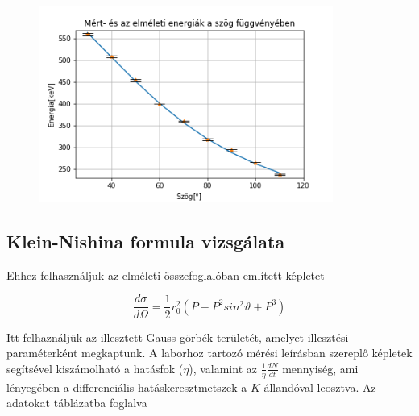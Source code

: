 \documentclass[a4paper,12pt]{article}
\begin{document}
\begin{figure}[!htb]
\centering
\includegraphics[width=0.86\textwidth]{en_deg.png}
\end{figure}

\subsection{Klein-Nishina formula vizsgálata}
\par Ehhez felhasználjuk az elméleti összefoglalóban említett képletet

\begin{equation*}
	\frac{d\sigma}{d\Omega} = \frac{1}{2}r_{0}^{2}(P - P^{2}sin^{2}\vartheta + P^{3})
\end{equation*}

\par Itt felhaználjük az illesztett Gauss-görbék területét, amelyet illesztési paraméterként megkaptunk. A laborhoz tartozó mérési leírásban szereplő képletek segítsével kiszámolható a hatásfok ($\eta$), valamint az $\frac{1}{\eta}\frac{dN}{dt}$ mennyiség, ami lényegében a differenciális hatáskeresztmetszek a $K$ állandóval leosztva. Az adatokat táblázatba foglalva
\end{document}
